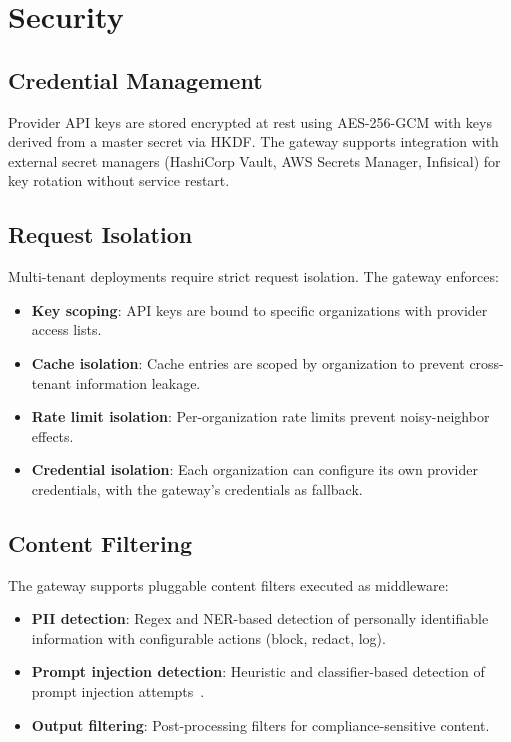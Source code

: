 \section{Security}

\label{sec:security}

\subsection{Credential Management}

Provider API keys are stored encrypted at rest using AES-256-GCM with keys derived from a master secret via HKDF. The gateway supports integration with external secret managers (HashiCorp Vault, AWS Secrets Manager, Infisical) for key rotation without service restart.

\subsection{Request Isolation}

Multi-tenant deployments require strict request isolation. The gateway enforces:

\begin{itemize}[leftmargin=*]
    \item \textbf{Key scoping}: API keys are bound to specific organizations with provider access lists.
    \item \textbf{Cache isolation}: Cache entries are scoped by organization to prevent cross-tenant information leakage.
    \item \textbf{Rate limit isolation}: Per-organization rate limits prevent noisy-neighbor effects.
    \item \textbf{Credential isolation}: Each organization can configure its own provider credentials, with the gateway's credentials as fallback.
\end{itemize}

\subsection{Content Filtering}

The gateway supports pluggable content filters executed as middleware:

\begin{itemize}[leftmargin=*]
    \item \textbf{PII detection}: Regex and NER-based detection of personally identifiable information with configurable actions (block, redact, log).
    \item \textbf{Prompt injection detection}: Heuristic and classifier-based detection of prompt injection attempts~\cite{perez2022ignore}.
    \item \textbf{Output filtering}: Post-processing filters for compliance-sensitive content.
\end{itemize}

